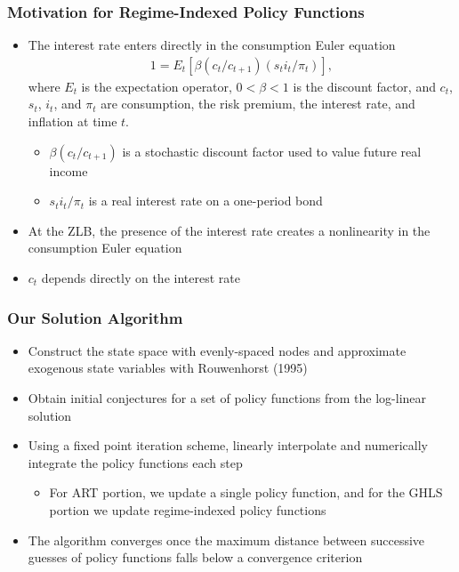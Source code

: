\documentclass[11pt]{beamer}
\begin{document}
\begin{frame}\frametitle{Motivation for Regime-Indexed Policy Functions}
\begin{itemize}\setlength{\itemsep}{6pt}
\item  <1-|handout:1>The interest rate enters directly in the consumption Euler equation
\begin{gather*}
1 =  E_t[\beta(c_t/c_{t+1})(s_ti_t/\pi_t)],
\end{gather*}
where $E_t$ is the expectation operator, $0 < \beta < 1$ is the discount factor, and $c_t$, $s_t$, $i_t$, and $\pi_t$ are consumption, the risk premium, the interest rate, and inflation at time $t$. 
\begin{itemize} \small
\item $\beta(c_t/c_{t+1})$ is a stochastic discount factor used to value future real income
\item $s_ti_t/\pi_t$ is a real interest rate on a one-period bond
\end{itemize}\normalfont
\item <2-|handout:1> At the ZLB, the presence of the interest rate creates a nonlinearity in the consumption Euler equation 
\item <3-|handout:1> $c_t$ depends directly on the interest rate
\end{itemize}
\end{frame}%
\begin{frame}\frametitle{Our Solution Algorithm} %
\begin{itemize}\setlength{\itemsep}{8pt}
\item   <1-|handout:1>Construct the state space with evenly-spaced nodes and approximate exogenous state variables with Rouwenhorst (1995)
\item  <2-|handout:1>Obtain initial conjectures for a set of policy functions from the log-linear solution
\item  <3-|handout:1>Using a fixed point iteration scheme, linearly interpolate and numerically integrate the policy functions each step
\begin{itemize}
\item For ART portion, we update a single policy function, and for the GHLS portion we update regime-indexed policy functions
\end{itemize}
\item <5-|handout:1> The algorithm converges once the maximum distance between successive guesses of policy functions falls below a convergence criterion

\end{itemize}
\end{frame}
\end{document}
